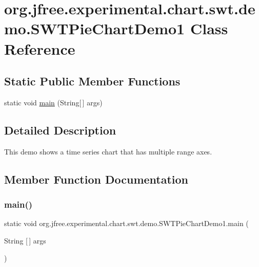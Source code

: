 \hypertarget{classorg_1_1jfree_1_1experimental_1_1chart_1_1swt_1_1demo_1_1_s_w_t_pie_chart_demo1}{}\section{org.\+jfree.\+experimental.\+chart.\+swt.\+demo.\+S\+W\+T\+Pie\+Chart\+Demo1 Class Reference}
\label{classorg_1_1jfree_1_1experimental_1_1chart_1_1swt_1_1demo_1_1_s_w_t_pie_chart_demo1}
\subsection*{Static Public Member Functions}
\begin{DoxyCompactItemize}
\item 
static void \mbox{\hyperlink{classorg_1_1jfree_1_1experimental_1_1chart_1_1swt_1_1demo_1_1_s_w_t_pie_chart_demo1_a5bcef5c681d5ff491d8cbfa55f856f85}{main}} (String\mbox{[}$\,$\mbox{]} args)
\end{DoxyCompactItemize}


\subsection{Detailed Description}
This demo shows a time series chart that has multiple range axes. 

\subsection{Member Function Documentation}
\mbox{\label{classorg_1_1jfree_1_1experimental_1_1chart_1_1swt_1_1demo_1_1_s_w_t_pie_chart_demo1_a5bcef5c681d5ff491d8cbfa55f856f85}} 
\subsubsection{\texorpdfstring{main()}{main()}}
{\footnotesize\ttfamily static void org.\+jfree.\+experimental.\+chart.\+swt.\+demo.\+S\+W\+T\+Pie\+Chart\+Demo1.\+main (\begin{DoxyParamCaption}\item[{String \mbox{[}$\,$\mbox{]}}]{args }\end{DoxyParamCaption})\hspace{0.3cm}{\ttfamily [static]}}

